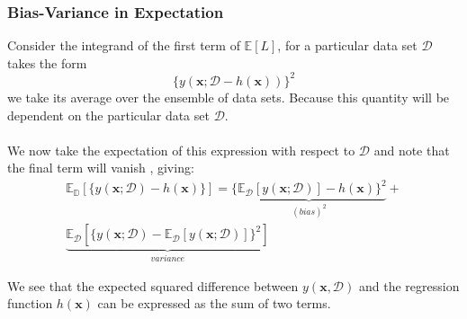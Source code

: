 \documentclass{beamer}
\begin{document}
\begin{frame}
\frametitle{Bias-Variance in Expectation }
 Consider the integrand of the first term of $\mathbb{E}[L]$, for a particular data set $\mathcal{D}$ takes the form
 \begin{equation}
 \{y(\bm{x};\mathcal{D}-h(\bm{x}))\}^2
 \end{equation}
 we take its average over the ensemble of data sets. Because this quantity will be dependent on the particular data set $\mathcal{D}$.\\~\\
 
 We now take the expectation of this expression with respect to $\mathcal{D}$ and note that the final term will vanish , giving:
 \begin{equation}
 \begin{split}
 \mathbb{E}_{\mathbb{D}}[\{y(\bm{x};\mathcal{D})-h(\bm{x})\}]
 =\underbrace{\{\mathbb{E}_{\mathcal{D}}[y(\bm{x};\mathcal{D})]-h(\bm{x})\}^2}_{(bias)^2}+ \\\underbrace{\mathbb{E}_{\mathcal{D}}[\{y(\bm{x};\mathcal{D})-\mathbb{E}_{\mathcal{D}}[y(\bm{x};\mathcal{D})]\}^2]}_{variance}
 \end{split}
 \end{equation}
 
 We see that the expected squared difference between $y(\bm{x},\mathcal{D})$ and the regression function $h(\bm{x})$ can be expressed as the sum of two terms.
\end{frame}
\end{document}
